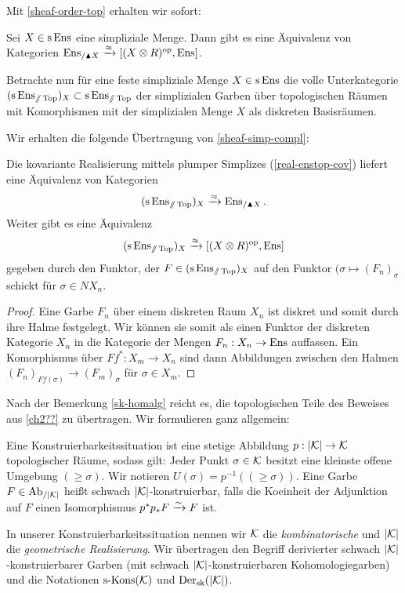 Mit \ref{sheaf-order-top} erhalten wir sofort:
\begin{prop}
  Sei $X \in \operatorname{s}\operatorname{Ens}$ eine simpliziale Menge. Dann gibt es eine
  Äquivalenz von Kategorien $\operatorname{Ens}_{/\blacktriangle X} \xrightarrow{\approx} [(X
    \otimes R)^\mathrm{op}, \operatorname{Ens}]$.
\end{prop}

Betrachte nun für eine feste simpliziale Menge $X \in \operatorname{s}\operatorname{Ens}$ die
volle Unterkategorie $(\operatorname{s}\operatorname{Ens}_{\mathbin{/\mkern-6mu/} \operatorname{Top}})_X \subset \operatorname{s}\operatorname{Ens}_{\mathbin{/\mkern-6mu/} \operatorname{Top}}$ der
simplizialen Garben über topologischen Räumen mit Komorphismen mit der
simplizialen Menge $X$ als diskreten Basisräumen.

Wir erhalten die folgende Übertragung von \ref{sheaf-simp-compl}:
\begin{prop}
  Die kovariante Realisierung mittels plumper Simplizes
  (\ref{real-enstop-cov}) liefert eine Äquivalenz von Kategorien
  \[ (\operatorname{s}\operatorname{Ens}_{\mathbin{/\mkern-6mu/} \operatorname{Top}})_X \xrightarrow{\approx} \operatorname{Ens}_{/\blacktriangle X}. \]
  Weiter gibt es eine Äquivalenz
  \[ (\operatorname{s}\operatorname{Ens}_{\mathbin{/\mkern-6mu/} \operatorname{Top}})_X \xrightarrow{\approx} [(X \otimes R)^\mathrm{op}, \operatorname{Ens}] \]
  gegeben durch den Funktor, der $F \in (\operatorname{s}\operatorname{Ens}_{\mathbin{/\mkern-6mu/} \operatorname{Top}})_X$ auf den
  Funktor $(\sigma \mapsto (F_n)_\sigma$ schickt für $\sigma \in
  NX_n$.
\end{prop}
\begin{proof}
  Eine Garbe $F_n$ über einem diskreten Raum $X_n$ ist diskret und
  somit durch ihre Halme festgelegt. Wir können sie somit als einen
  Funktor der diskreten Kategorie $X_n$ in die Kategorie der Mengen
  $F_n: X_n \to \operatorname{Ens}$ auffassen. Ein Komorphismus über $Ff^*: X_m \to
  X_n$ sind dann Abbildungen zwischen den Halmen $(F_n)_{Ff(\sigma)}
  \to (F_m)_\sigma$ für $\sigma \in X_m$.
\end{proof}


Nach der Bemerkung \ref{sk-homalg} reicht es, die topologischen Teile
des Beweises aus \ref{ch2??} zu übertragen. Wir formulieren ganz
allgemein:
\begin{defn}
  Eine Konstruierbarkeitssituation ist eine stetige Abbildung $p: |\mathcal{K}|
  \to \mathcal{K}$ topologischer Räume, sodass gilt: Jeder Punkt $\sigma \in
  \mathcal{K}$ besitzt eine kleinste offene Umgebung $(\geq \sigma)$. Wir
  notieren $U(\sigma) = p^{-1}((\geq \sigma))$. Eine Garbe $F \in
  \operatorname{Ab}_{/|\mathcal{K}|}$ heißt schwach $|\mathcal{K}|$-konstruierbar, falls die Koeinheit der
  Adjunktion auf $F$ einen Isomorphismus $p^* p_* F \xrightarrow[]{\sim} F$ ist.
\end{defn}
In unserer Konstruierbarkeitssituation nennen wir $\mathcal{K}$ die
\emph{kombinatorische} und $|\mathcal{K}|$ die \emph{geometrische
  Realisierung}. Wir übertragen den Begriff derivierter schwach
$|\mathcal{K}|$-konstruierbarer Garben (mit schwach $|\mathcal{K}|$-konstruierbaren
Kohomologiegarben) und die Notationen $\operatorname{s-Kons}(\mathcal{K})$ und $\operatorname{Der}_{\mathrm{sk}}(|\mathcal{K}|)$.

